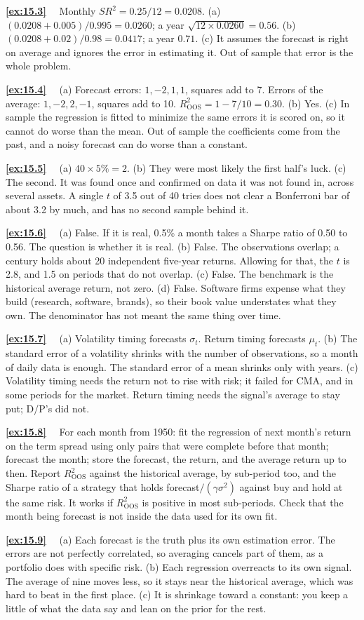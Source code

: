\documentclass[11pt]{article}
\newcounter{ex}[section]
\newcommand{\sol}[1]{\par\smallskip\textbf{\ref{#1}}\ \ }
\newcommand{\SR}{\mathit{SR}}
\begin{document}
{\sol{ex:15.3} Monthly $\SR^{2} = 0.25/12 = 0.0208$. (a) $(0.0208 + 0.005)/0.995 = 0.0260$; a year $\sqrt{12\times 0.0260} =
0.56$. (b) $(0.0208 + 0.02)/0.98 = 0.0417$; a year $0.71$. (c) It assumes the forecast is right on average and ignores
the error in estimating it. Out of sample that error is the whole problem.

\sol{ex:15.4} (a) Forecast errors: $1, -2, 1, 1$, squares add to 7. Errors of the average: $1, -2, 2, -1$, squares add to
10. $R^{2}_{\text{OOS}} = 1 - 7/10 = 0.30$. (b) Yes. (c) In sample the regression is fitted to minimize the same errors
it is scored on, so it cannot do worse than the mean. Out of sample the coefficients come from the past, and a noisy
forecast can do worse than a constant.

\sol{ex:15.5} (a) $40\times 5\% = 2$. (b) They were most likely the first half's luck. (c) The second. It was found once
and confirmed on data it was not found in, across several assets. A single $t$ of 3.5 out of 40 tries does not clear
a Bonferroni bar of about 3.2 by much, and has no second sample behind it.

\sol{ex:15.6} (a) False. If it is real, 0.5\% a month takes a Sharpe ratio of 0.50 to 0.56. The question is whether it
is real. (b) False. The observations overlap; a century holds about 20 independent five-year returns. Allowing for
that, the $t$ is 2.8, and 1.5 on periods that do not overlap. (c) False. The benchmark is the historical average
return, not zero. (d) False. Software firms expense what they build (research, software, brands), so their book value
understates what they own. The denominator has not meant the same thing over time.

\sol{ex:15.7} (a) Volatility timing forecasts $\sigma_{t}$. Return timing forecasts $\mu_{t}$. (b) The standard error of a
volatility shrinks with the number of observations, so a month of daily data is enough. The standard error of a mean
shrinks only with years. (c) Volatility timing needs the return not to rise with risk; it failed for CMA, and in some
periods for the market. Return timing needs the signal's average to stay put; D/P's did not.

\sol{ex:15.8} For each month from 1950: fit the regression of next month's return on the term spread using only pairs
that were complete before that month; forecast the month; store the forecast, the return, and the average return up
to then. Report $R^{2}_{\text{OOS}}$ against the historical average, by sub-period too, and the Sharpe ratio of a
strategy that holds forecast$/(\gamma\sigma^{2})$ against buy and hold at the same risk. It works if
$R^{2}_{\text{OOS}}$ is positive in most sub-periods. Check that the month being forecast is not inside the data used
for its own fit.

\sol{ex:15.9} (a) Each forecast is the truth plus its own estimation error. The errors are not perfectly correlated, so
averaging cancels part of them, as a portfolio does with specific risk. (b) Each regression overreacts to its own
signal. The average of nine moves less, so it stays near the historical average, which was hard to beat in the first
place. (c) It is shrinkage toward a constant: you keep a little of what the data say and lean on the prior for the
rest.
}
\fi
\end{document}
